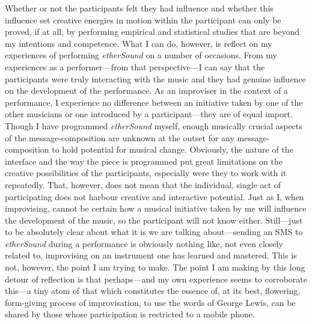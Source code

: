 Whether or not the participants felt they had influence and whether this influence set creative energies in motion within the participant can only be proved, if at all, by performing empirical and statistical studies that are beyond my intentions and competence. What I can do, however, is reflect on my experiences of performing \emph{etherSound} on a number of occasions. From my experiences as a performer---from that perspective---I can say that the participants were truly interacting with the music and they had genuine influence on the development of the performance. As an improviser in the context of a performance, I experience no difference between an initiative taken by one of the other musicians or one introduced by a participant---they are of equal import. 
Though I have programmed \emph{etherSound} myself, enough musically crucial aspects of the message-composition are unknown at the outset for any message-composition to hold potential for musical change. Obviously, the nature of the interface and the way the piece is programmed put great limitations on the creative possibilities of the participants, especially were they to work with it repeatedly. That, however, does not mean that the individual, single act of participating does not harbour creative and interactive potential. Just as I, when improvising, cannot be certain how a musical initiative taken by me will influence the development of the music, so the participant will not know either. 
Still---just to be absolutely clear about what it is we are talking about---sending an SMS to \emph{etherSound} during a performance is obviously nothing like, not even closely related to, improvising on an instrument one has learned and mastered. This is not, however, the point I am trying to make. The point I am making by this long detour of reflection is that perhaps---and my own experience seems to corroborate this---a tiny atom of that which constitutes the essence of, at its best, flowering, form-giving process of improvisation, to use the words of George Lewis, can be shared by those whose participation is restricted to a mobile phone.


